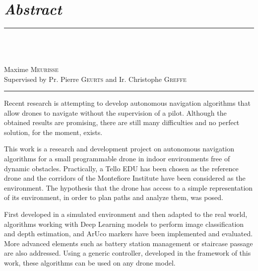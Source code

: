 \chapter*{\centering \normalfont\textit{Abstract}}
\markboth{}{}

\begin{minipage}[t][0.25\textheight]{\textwidth}
    \noindent\rule{\textwidth}{1pt}
    \vspace{0.2em}
    \begin{center}
        \makeatletter

        {\scshape\Large\@institute}\vspace{0.7em}\\
        {\large\@faculty}\vspace{1.5em}\\

        {\bfseries\large\@title}\vspace{1.5em}\\

        Maxime \textsc{Meurisse}\\
        Supervised by Pr. Pierre \textsc{Geurts} and Ir. Christophe \textsc{Greffe}\\
        \@date

        \makeatother
    \end{center}
    \vspace{0.2em}
    \noindent\rule{\textwidth}{1pt}
\end{minipage}

Recent research is attempting to develop autonomous navigation algorithms that allow drones to navigate without the supervision of a pilot. Although the obtained results are promising, there are still many difficulties and no perfect solution, for the moment, exists.

This work is a research and development project on autonomous navigation algorithms for a small programmable drone in indoor environments free of dynamic obstacles. Practically, a Tello EDU has been chosen as the reference drone and the corridors of the Montefiore Institute have been considered as the environment. The hypothesis that the drone has access to a simple representation of its environment, in order to plan paths and analyze them, was posed.

First developed in a simulated environment and then adapted to the real world, algorithms working with Deep Learning models to perform image classification and depth estimation, and ArUco markers have been implemented and evaluated. More advanced elements such as battery station management or staircase passage are also addressed. Using a generic controller, developed in the framework of this work, these algorithms can be used on any drone model.

